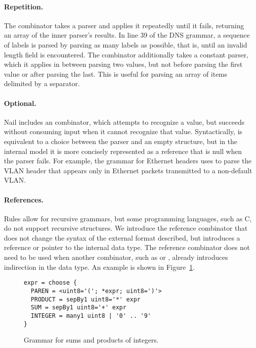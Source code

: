 \paragraph{Repetition.}

The  combinator takes a parser and applies it repeatedly
until it fails, returning an array of the inner parser's results. In line 39 of the DNS grammar, a
sequence of labels is parsed by parsing as many labels as possible, that is, until an invalid length
field is encountered.
The  combinator
additionally takes a constant parser, which it applies in between parsing
two values, but not before parsing the first value or after parsing the
last.  This is useful for parsing an array of items delimited by a separator.
\paragraph{Optional.}
Nail includes an  combinator, which attempts to recognize a value, but succeeds
without consuming input when it cannot recognize that value. Syntactically,  is
equivalent to a choice between the parser and an empty structure, but in the internal model it is
more concisely represented as a reference that is null when the parser fails.
For example, the grammar for  Ethernet headers uses  to parse the VLAN
header that appears only in Ethernet packets transmitted to a non-default VLAN\@.

\paragraph{References.}
Rules allow for recursive grammars, but some programming languages, such as C, do not support
recursive structures.  We introduce the
reference combinator \cc{*}  that does not change the syntax of the external format described, but
introduces a reference or pointer to the internal data type.
The reference combinator does not need to be used when another combinator, such as  or
, already introduces indirection in the data type. An example is shown in Figure~\ref{fig:grammar-arith}.

\begin{figure}
\smaller[0.5]
\begin{verbatim}
expr = choose {
  PAREN = <uint8='('; *expr; uint8=')'>
  PRODUCT = sepBy1 uint8='*' expr
  SUM = sepBy1 uint8='+' expr
  INTEGER = many1 uint8 | '0' .. '9'
}
\end{verbatim}
\caption{Grammar for sums and products of integers.}
\label{fig:grammar-arith}
\end{figure}



